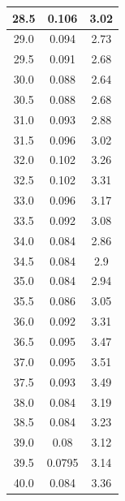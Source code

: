 \documentclass[a4paper,14pt]{article}
\begin{document}
\begin{longtable}{|c|c|c|}
28.5 & 0.106 & 3.02 \\ \hline
29.0 & 0.094 & 2.73 \\ \hline
29.5 & 0.091 & 2.68 \\ \hline
30.0 & 0.088 & 2.64 \\ \hline
30.5 & 0.088 & 2.68 \\ \hline
31.0 & 0.093 & 2.88 \\ \hline
31.5 & 0.096 & 3.02 \\ \hline
32.0 & 0.102 & 3.26 \\ \hline
32.5 & 0.102 & 3.31 \\ \hline
33.0 & 0.096 & 3.17 \\ \hline
33.5 & 0.092 & 3.08 \\ \hline
34.0 & 0.084 & 2.86 \\ \hline
34.5 & 0.084 & 2.9 \\ \hline
35.0 & 0.084 & 2.94 \\ \hline
35.5 & 0.086 & 3.05 \\ \hline
36.0 & 0.092 & 3.31 \\ \hline
36.5 & 0.095 & 3.47 \\ \hline
37.0 & 0.095 & 3.51 \\ \hline
37.5 & 0.093 & 3.49 \\ \hline
38.0 & 0.084 & 3.19 \\ \hline
38.5 & 0.084 & 3.23 \\ \hline
39.0 & 0.08 & 3.12 \\ \hline
39.5 & 0.0795 & 3.14 \\ \hline
40.0 & 0.084 & 3.36 \\ \hline

\end{longtable}
\end{document}
